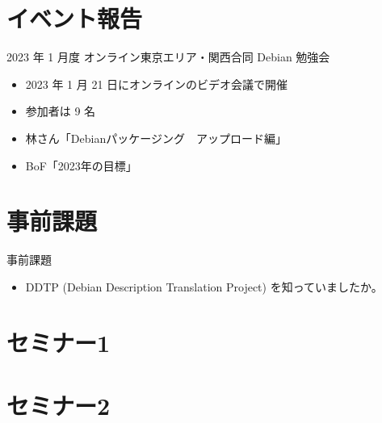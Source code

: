 \section{イベント報告}

\begin{frame}{2023 年 1 月度 オンライン東京エリア・関西合同 Debian 勉強会}
\begin{itemize}
\item 2023 年 1 月 21 日にオンラインのビデオ会議で開催
\item 参加者は 9 名
\item 林さん「Debianパッケージング　アップロード編」
\item BoF「2023年の目標」
\end{itemize}
\end{frame}


\section{事前課題}


\begin{frame}{事前課題}
  \begin{itemize}
  \item DDTP (Debian Description Translation Project) を知っていましたか。
  \end{itemize}
\end{frame}

{\footnotesize
 
}

%

\section{セミナー1}

\section{セミナー2}



